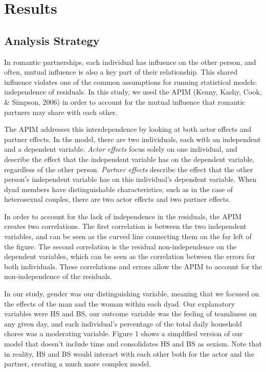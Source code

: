 \documentclass[
  english,
  man]{apa6}
\begin{document}
\hypertarget{results}{%
\section{Results}\label{results}}

\hypertarget{analysis-strategy}{%
\subsection{Analysis Strategy}\label{analysis-strategy}}

In romantic partnerships, each individual has influence on the other person, and often, mutual influence is also a key part of their relationship. This shared influence violates one of the common assumptions for running statistical models: independence of residuals. In this study, we used the APIM (Kenny, Kashy, Cook, \& Simpson, 2006) in order to account for the mutual influence that romantic partners may share with each other.

The APIM addresses this interdependence by looking at both actor effects and partner effects. In the model, there are two individuals, each with an independent and a dependent variable. \emph{Actor effects} focus solely on one individual, and describe the effect that the independent variable has on the dependent variable, regardless of the other person. \emph{Partner effects} describe the effect that the other person's independent variable has on this individual's dependent variable. When dyad members have distinguishable characteristics, such as in the case of heterosexual couples, there are two actor effects and two partner effects.

In order to account for the lack of independence in the residuals, the APIM creates two correlations. The first correlation is between the two independent variables, and can be seen as the curved line connecting them on the far left of the figure. The second correlation is the residual non-independence on the dependent variables, which can be seen as the correlation between the errors for both individuals. These correlations and errors allow the APIM to account for the non-independence of the residuals.

In our study, gender was our distinguishing variable, meaning that we focused on the effects of the man and the woman within each dyad. Our explanatory variables were HS and BS, our outcome variable was the feeling of teamliness on any given day, and each individual's percentage of the total daily household chores was a moderating variable. Figure 1 shows a simplified version of our model that doesn't include time and consolidates HS and BS as sexism. Note that in reality, HS and BS would interact with each other both for the actor and the partner, creating a much more complex model.
\end{document}
